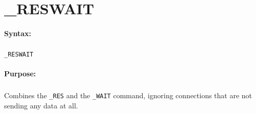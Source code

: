 
\newpage
\section{\_RESWAIT}
\label{cmd:_RESWAIT}

\paragraph{Syntax:}
\subparagraph{}
\texttt{\_RESWAIT}

\paragraph{Purpose:}
\subparagraph{}
Combines the \texttt{\_RES} and the \texttt{\_WAIT} command, 
ignoring connections that are not sending any data at all.